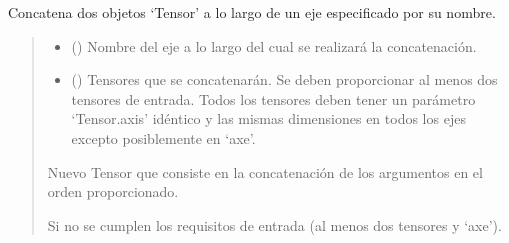 \documentclass[letterpaper,10pt,english]{sphinxmanual}
\begin{document}
\begin{fulllineitems}
\label{\detokenize{utils.tensor:utils.tensor.append}}
\pysigstartsignatures
{}
\pysigstopsignatures
\sphinxAtStartPar
Concatena dos objetos ‘Tensor’ a lo largo de un eje especificado por su nombre.
\begin{quote}\begin{description}
\begin{itemize}
\item {} 
\sphinxAtStartPar
{} () \textendash{} Nombre del eje a lo largo del cual se realizará la concatenación.

\item {} 
\sphinxAtStartPar
{} ({\hyperref[\detokenize{utils.tensor:utils.tensor.Tensor}]{}}) \textendash{} Tensores que se concatenarán. Se deben proporcionar al menos dos tensores de entrada.
Todos los tensores deben tener un parámetro ‘Tensor.axis’ idéntico y las mismas
dimensiones en todos los ejes excepto posiblemente en ‘axe’.

\end{itemize}

\sphinxAtStartPar
Nuevo Tensor que consiste en la concatenación de los argumentos en el orden proporcionado.

\sphinxAtStartPar
{\hyperref[\detokenize{utils.tensor:utils.tensor.Tensor}]{}}

\sphinxAtStartPar
{} \textendash{} Si no se cumplen los requisitos de entrada (al menos dos tensores y ‘axe’).

\end{description}\end{quote}

\end{fulllineitems}

\end{document}
